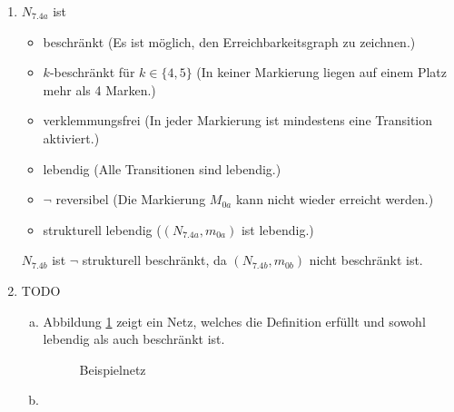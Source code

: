 \documentclass[a4paper]{scrartcl}
\begin{document}
\begin{enumerate}
    \item
        $N_{7.4a}$ ist
        \begin{itemize}
            \item beschränkt (Es ist möglich, den Erreichbarkeitsgraph zu
                zeichnen.)
            \item $k$-beschränkt für $k \in \{4,5\}$ (In keiner Markierung
                liegen auf einem Platz mehr als 4 Marken.)
            \item verklemmungsfrei (In jeder Markierung ist mindestens eine
                Transition aktiviert.)
            \item lebendig (Alle Transitionen sind lebendig.)
            \item $\lnot$ reversibel (Die Markierung $M_{0a}$ kann nicht wieder
                erreicht werden.)
            \item strukturell lebendig ($(N_{7.4a}, m_{0a})$ ist lebendig.)
        \end{itemize}

        $N_{7.4b}$ ist $\lnot$ strukturell beschränkt, da $(N_{7.4b}, m_{0b})$
        nicht beschränkt ist.

    \item TODO
        \begin{enumerate}[(a)]
            \item
                Abbildung \ref{fig:beispiel} zeigt ein Netz, welches die
                Definition erfüllt und sowohl lebendig als auch beschränkt ist.
                \begin{figure}[h]
                    \centering
                    \caption{Beispielnetz}
                    \label{fig:beispiel}
                \end{figure}

            \item

        \end{enumerate}

\end{enumerate}
\end{document}
